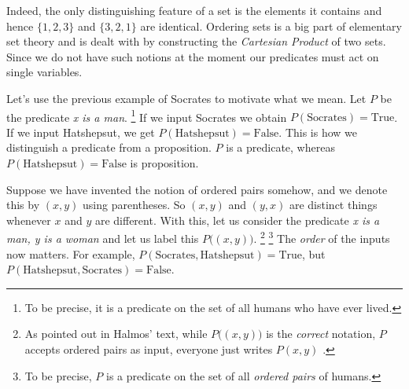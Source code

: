         Indeed, the only distinguishing feature of a set is the elements it
        contains and hence $\{1,2,3\}$ and $\{3,2,1\}$ are identical. Ordering
        sets is a big part of elementary set theory and is dealt with by
        constructing the \textit{Cartesian Product} of
        two sets. Since we do not have such notions at the moment our predicates
        must act on single variables.
        \begin{example}
            Let's use the previous example of Socrates to motivate what we mean.
            Let $P$ be the predicate \textit{x is a man}.%
            \footnote{%
                To be precise, it is a predicate on the set of all humans who
                have ever lived.
            }
            If we input Socrates we obtain $P(\text{Socrates})=\text{True}$. If
            we input Hatshepsut, we get $P(\text{Hatshepsut})=\text{False}$.
            This is how we distinguish a predicate from a proposition. $P$ is
            a predicate, whereas $P(\text{Hatshepsut})=\text{False}$ is
            proposition.
        \end{example}
        \begin{example}
            Suppose we have invented the notion of ordered pairs somehow, and
            we denote this by $(x,y)$ using parentheses. So $(x,y)$ and $(y,x)$
            are distinct things whenever $x$ and $y$ are different. With this,
            let us consider the predicate \textit{x is a man, y is a woman} and
            let us label this $P\big((x,y)\big)$.%
            \footnote{%
                As pointed out in Halmos' text, while $P\big((x,y)\big)$ is the
                \textit{correct} notation, $P$ accepts ordered pairs as input,
                everyone just writes $P(x,y)$ \cite[p.~32]{Halmos1974}.
            }
            \footnote{%
                To be precise, $P$ is a predicate on the set of all
                \textit{ordered pairs} of humans.
            }
            The \textit{order} of the inputs now
            matters. For example,
            $P(\text{Socrates},\text{Hatshepsut})=\text{True}$, but
            $P(\text{Hatshepsut},\text{Socrates})=\text{False}$.
        \end{example}
